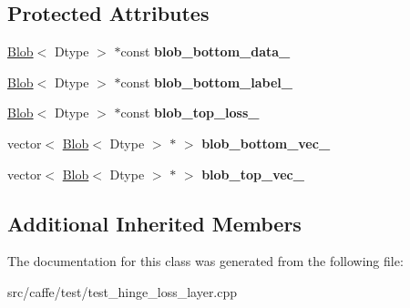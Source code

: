 \subsection*{Protected Attributes}
\begin{DoxyCompactItemize}
\item 
\mbox{\label{classcaffe_1_1_hinge_loss_layer_test_a6d327fb374502193cdee88d9d03a813c}} 
\mbox{\hyperlink{classcaffe_1_1_blob}{Blob}}$<$ Dtype $>$ $\ast$const {\bfseries blob\+\_\+bottom\+\_\+data\+\_\+}
\item 
\mbox{\label{classcaffe_1_1_hinge_loss_layer_test_a0269ada017f322324061a9d37d675b18}} 
\mbox{\hyperlink{classcaffe_1_1_blob}{Blob}}$<$ Dtype $>$ $\ast$const {\bfseries blob\+\_\+bottom\+\_\+label\+\_\+}
\item 
\mbox{\label{classcaffe_1_1_hinge_loss_layer_test_a2272f2392f8c7a9a5efe85ce75ad1ca8}} 
\mbox{\hyperlink{classcaffe_1_1_blob}{Blob}}$<$ Dtype $>$ $\ast$const {\bfseries blob\+\_\+top\+\_\+loss\+\_\+}
\item 
\mbox{\label{classcaffe_1_1_hinge_loss_layer_test_a43bad14ffc02b2f0f00558d76ec20818}} 
vector$<$ \mbox{\hyperlink{classcaffe_1_1_blob}{Blob}}$<$ Dtype $>$ $\ast$ $>$ {\bfseries blob\+\_\+bottom\+\_\+vec\+\_\+}
\item 
\mbox{\label{classcaffe_1_1_hinge_loss_layer_test_a257bdb1d4678f7dcf6fa02a60a827639}} 
vector$<$ \mbox{\hyperlink{classcaffe_1_1_blob}{Blob}}$<$ Dtype $>$ $\ast$ $>$ {\bfseries blob\+\_\+top\+\_\+vec\+\_\+}
\end{DoxyCompactItemize}
\subsection*{Additional Inherited Members}


The documentation for this class was generated from the following file\+:\begin{DoxyCompactItemize}
\item 
src/caffe/test/test\+\_\+hinge\+\_\+loss\+\_\+layer.\+cpp\end{DoxyCompactItemize}

